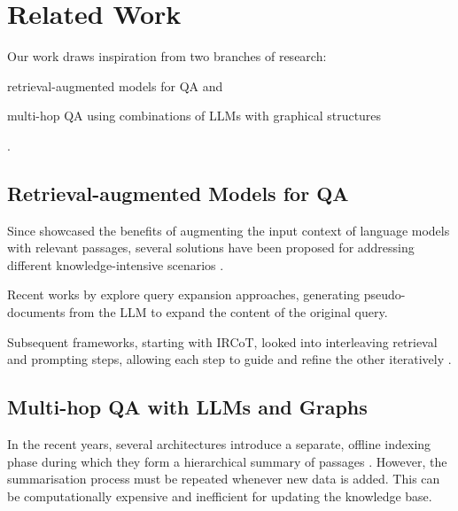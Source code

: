 \section{Related Work}


Our work draws inspiration from two branches of research: \begin{inparaenum}[(i)]\item retrieval-augmented models for QA and \item multi-hop QA using combinations of LLMs with graphical structures\end{inparaenum}.

\subsection{Retrieval-augmented Models for QA}
Since \citeauthor{Lewis2020} showcased the benefits of augmenting the input context of language models with relevant passages, several solutions have been proposed for addressing different knowledge-intensive scenarios \cite{Pan2023}.

Recent works by \citeauthor{Wang2023a,Shen2024} explore query expansion approaches, generating pseudo-documents from the LLM to expand the content of the original query.

Subsequent frameworks, starting with IRCoT, looked into interleaving retrieval and prompting steps, allowing each step to guide and refine the other iteratively \cite{Trivedi2023,Jiang2023,Su2024}.



\subsection{Multi-hop QA with LLMs and Graphs}

In the recent years, several architectures introduce a separate, offline indexing phase during which they form a hierarchical summary of passages  \cite{Chen2023,Sarthi2024,Edge2024}.
However, the summarisation process must be repeated whenever new data is added. This can be computationally expensive and inefficient for updating the knowledge base. 


